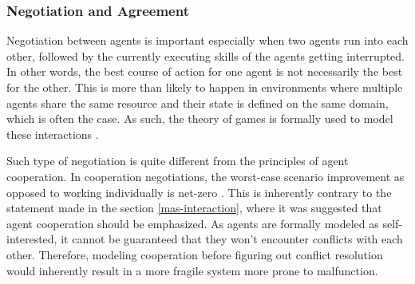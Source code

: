 \documentclass[0main.tex]{subfiles}
\begin{document}

\subsubsection{Negotiation and Agreement}

Negotiation between agents is important especially when two agents run into each other, 
followed by the currently executing skills of the agents getting interrupted. In other words, 
the best course of action for one agent is not necessarily the best for the other. This is more than
likely to happen in environments where multiple agents share the same resource and their state
is defined on the same domain, which is often the case. As such, the theory of games is formally 
used to model these interactions \cite{Binder2022}. 

Such type of negotiation is quite different from the principles of agent cooperation. In
cooperation negotiations, the worst-case scenario improvement as opposed to working
individually is net-zero \cite{Binder2022}.  This is inherently contrary to the statement made
in the section \ref{mas-interaction}, where it was suggested that agent cooperation should be
emphasized. As agents are formally modeled as self-interested, it cannot be guaranteed that
they won't encounter conflicts with each other. Therefore, modeling cooperation before figuring
out conflict resolution would inherently result in a more fragile system more prone to
malfunction. 
\end{document}

